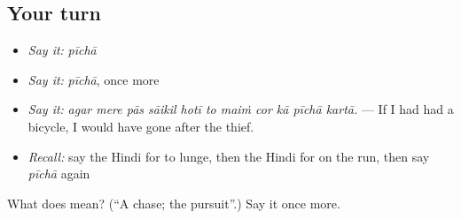 \subsection*{Your turn}
\begin{itemize}
\raggedright
  \item \emph{Say it:} \emph{pīchā}
  \item \emph{Say it:} \emph{pīchā}, once more
  \item \emph{Say it:} \emph{agar mere pās sāikil hotī to maiṁ cor kā pīchā kartā.} — If I had had a bicycle, I would have gone after the thief.
  \item \emph{Recall:} say the Hindi for to lunge, then the Hindi for on the run, then say \emph{pīchā} again
\end{itemize}

\begin{tcolorbox}[breakable,colback=teal!4,colframe=teal!35!black,title={Before you move on}]
What does  mean? (\textquotedblleft{}A chase; the pursuit\textquotedblright{}.) Say it once more.
\end{tcolorbox}
